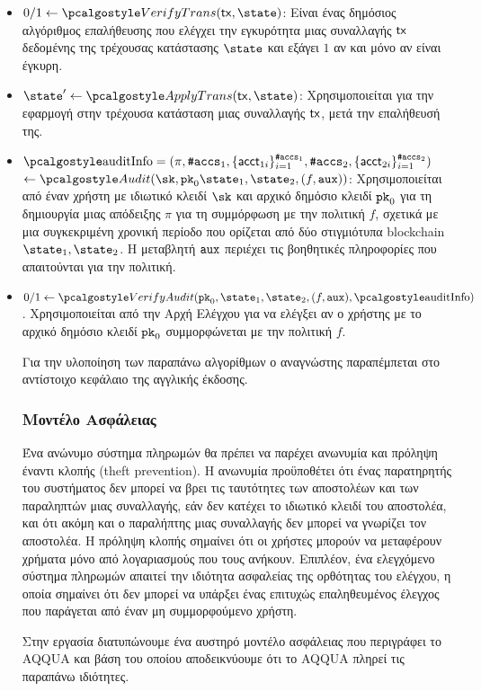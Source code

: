 \begin{itemize}
    \item $0/1 \gets \vertxn(\txn, \state)$: 
    Είναι ένας δημόσιος αλγόριθμος επαλήθευσης που ελέγχει την εγκυρότητα μιας συναλλαγής $\textup{\textsf{tx}}$ δεδομένης της τρέχουσας κατάστασης $\state$ και εξάγει $1$ αν και μόνο αν είναι έγκυρη. 
    
    \item $\state' \gets \applytxn (\txn, \state)$:
    Χρησιμοποιείται για την εφαρμογή στην τρέχουσα κατάσταση μιας συναλλαγής $\textup{\textsf{tx}}$, μετά την επαλήθευσή της.
    
    \item $\auditinfo = (\pi, {\numaccs}_1, \{ \acct_{1i} \}_{i=1}^{\numaccs_1}, {\numaccs}_2, \{ \acct_{2i} \}_{i=1}^{\numaccs_2}) $ \\$\gets \audit(\sk,\inpk \snap_{1}, \snap_{2}, (f, \aux))$: 
    Χρησιμοποιείται από έναν χρήστη με ιδιωτικό κλειδί $\sk$ και αρχικό δημόσιο κλειδί $\textup{\texttt{pk}}_{0}$ για τη δημιουργία μιας απόδειξης $\pi$ για τη συμμόρφωση με την πολιτική $f$, σχετικά με μια συγκεκριμένη χρονική περίοδο που ορίζεται από δύο στιγμιότυπα blockchain $\snap_1, \snap_2$. 
    Η μεταβλητή ${\textup{\texttt{aux}}}$ περιέχει τις βοηθητικές πληροφορίες που απαιτούνται για την πολιτική. 
    
    \item $0/1 \gets \vera(\inpk, \snap_1, \snap_2, (f,\aux), \auditinfo)$. 
    Χρησιμοποιείται από την Αρχή Ελέγχου για να ελέγξει αν ο χρήστης με το αρχικό δημόσιο κλειδί $\textup{\texttt{pk}}_{0}$ συμμορφώνεται με την πολιτική $f$.

    Για την υλοποίηση των παραπάνω αλγορίθμων ο αναγνώστης παραπέμπεται στο αντίστοιχο κεφάλαιο της αγγλικής έκδοσης.

    \subsubsection{Μοντέλο Ασφάλειας}
    Ένα ανώνυμο σύστημα πληρωμών θα πρέπει να παρέχει ανωνυμία και πρόληψη έναντι κλοπής (theft prevention).
    Η ανωνυμία προϋποθέτει ότι ένας παρατηρητής του συστήματος δεν μπορεί να βρει τις ταυτότητες των αποστολέων και των παραληπτών μιας συναλλαγής, εάν δεν κατέχει το ιδιωτικό κλειδί του αποστολέα, και ότι ακόμη και ο παραλήπτης μιας συναλλαγής δεν μπορεί να γνωρίζει τον αποστολέα. Η πρόληψη κλοπής σημαίνει ότι οι χρήστες μπορούν να μεταφέρουν χρήματα μόνο από λογαριασμούς που τους ανήκουν. Επιπλέον, ένα ελεγχόμενο σύστημα πληρωμών απαιτεί την ιδιότητα ασφαλείας της ορθότητας του ελέγχου, η οποία σημαίνει ότι δεν μπορεί να υπάρξει ένας επιτυχώς επαληθευμένος έλεγχος που παράγεται από έναν μη συμμορφούμενο χρήστη.

    Στην εργασία διατυπώνουμε ένα αυστηρό μοντέλο ασφάλειας που περιγράφει το AQQUA και βάση του οποίου αποδεικνύουμε ότι το AQQUA πληρεί τις παραπάνω ιδιότητες.

\end{itemize}


